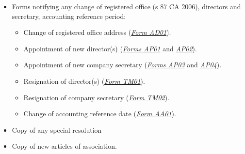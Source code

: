 \documentclass[
]{article}
\providecommand{\tightlist}{%
  \setlength{\itemsep}{0pt}\setlength{\parskip}{0pt}}
\begin{document}
\begin{itemize}
\tightlist
\item
  Forms notifying any change of registered office (s 87 CA 2006),
  directors and secretary, accounting reference period:

  \begin{itemize}
  \tightlist
  \item
    Change of registered office address
    (\emph{\href{https://uk.westlaw.com/7-422-1650?originationContext=document\&transitionType=DocumentItem\&contextData=(sc.Default)\&ppcid=499185a9ecb940b1a3a505768c861e1b}{Form
    AD01}}).
  \item
    Appointment of new director(s)
    (\emph{\href{https://uk.westlaw.com/9-422-1649?originationContext=document\&transitionType=DocumentItem\&contextData=(sc.Default)\&ppcid=499185a9ecb940b1a3a505768c861e1b}{Forms
    AP01}} and
    \emph{\href{https://uk.westlaw.com/2-422-2044?originationContext=document\&transitionType=DocumentItem\&contextData=(sc.Default)\&ppcid=499185a9ecb940b1a3a505768c861e1b}{AP02}}).
  \item
    Appointment of new company secretary
    (\emph{\href{https://uk.westlaw.com/1-422-1648?originationContext=document\&transitionType=DocumentItem\&contextData=(sc.Default)\&ppcid=499185a9ecb940b1a3a505768c861e1b}{Forms
    AP03}} and
    \emph{\href{https://uk.westlaw.com/4-422-2043?originationContext=document\&transitionType=DocumentItem\&contextData=(sc.Default)\&ppcid=499185a9ecb940b1a3a505768c861e1b}{AP04}}).
  \item
    Resignation of director(s)
    (\emph{\href{https://uk.westlaw.com/3-422-1647?originationContext=document\&transitionType=DocumentItem\&contextData=(sc.Default)\&ppcid=499185a9ecb940b1a3a505768c861e1b}{Form
    TM01}}).
  \item
    Resignation of company secretary
    (\emph{\href{https://uk.westlaw.com/6-422-2042?originationContext=document\&transitionType=DocumentItem\&contextData=(sc.Default)\&ppcid=499185a9ecb940b1a3a505768c861e1b}{Form
    TM02}}).
  \item
    Change of accounting reference date
    (\emph{\href{https://uk.westlaw.com/0-422-1291?originationContext=document\&transitionType=DocumentItem\&contextData=(sc.Default)\&ppcid=499185a9ecb940b1a3a505768c861e1b}{Form
    AA01}}).
  \end{itemize}
\item
  Copy of any special resolution
\item
  Copy of new articles of association.
\end{itemize}
\end{document}
